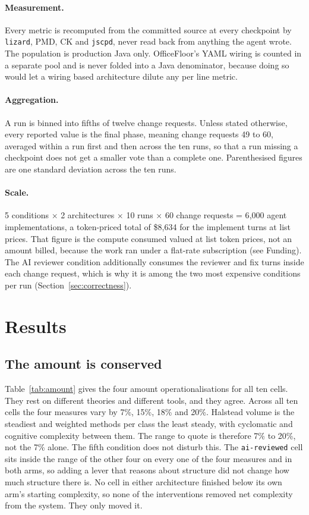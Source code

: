 \documentclass[11pt,a4paper]{article}
\begin{document}
\paragraph{Measurement.} Every metric is recomputed from the committed source
at every checkpoint by \texttt{lizard}, PMD, CK \cite{ck-tool} and
\texttt{jscpd}, never read back from anything the agent wrote. The population
is production Java only. OfficeFloor's YAML wiring is counted in a separate
pool and is never folded into a Java denominator, because doing so would let a
wiring based architecture dilute any per line metric.

\paragraph{Aggregation.} A run is binned into fifths of twelve change requests.
Unless stated otherwise, every reported value is the final phase, meaning
change requests 49 to 60, averaged within a run first and then across the ten
runs, so that a run missing a checkpoint does not get a smaller vote than a
complete one. Parenthesised figures are one standard deviation across the ten
runs.

\paragraph{Scale.} 5 conditions $\times$ 2 architectures $\times$ 10 runs
$\times$ 60 change requests = 6{,}000 agent implementations, a token-priced total
of \$8{,}634 for the implement turns at list prices. That figure is the compute
consumed valued at list token prices, not an amount billed, because the work ran
under a flat-rate subscription (see Funding). The AI reviewer condition
additionally consumes the reviewer and fix turns inside each change request,
which is why it is among the two most expensive conditions per run
(Section~\ref{sec:correctness}).

\section{Results}

\subsection{The amount is conserved}

Table~\ref{tab:amount} gives the four amount operationalisations for all ten
cells. They rest on different theories and different tools, and they agree.
Across all ten cells the four measures vary by 7\%, 15\%, 18\% and 20\%.
Halstead volume is the steadiest and weighted methods per class the least steady,
with cyclomatic and cognitive complexity between them. The range to quote is
therefore 7\% to 20\%, not the 7\% alone. The fifth condition does not disturb
this. The \texttt{ai-reviewed} cell sits inside the range of the other four on
every one of the four measures and in both arms, so adding a lever that reasons
about structure did not change how much structure there is. No cell in either
architecture finished below its own arm's starting complexity, so none of the
interventions removed net complexity from the system. They only moved it.
\end{document}
